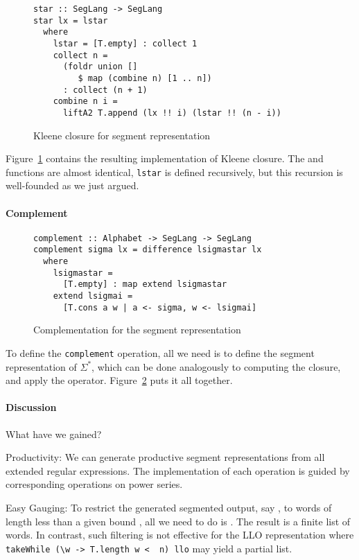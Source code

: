 \begin{figure}[tp]
\begin{lstlisting}
star :: SegLang -> SegLang
star lx = lstar
  where
    lstar = [T.empty] : collect 1
    collect n =
      (foldr union [] 
         $ map (combine n) [1 .. n])
      : collect (n + 1)
    combine n i =
      liftA2 T.append (lx !! i) (lstar !! (n - i))
\end{lstlisting}
  \caption{Kleene closure for segment representation}
  \label{fig:star-with-segments}
\end{figure}
Figure~\ref{fig:star-with-segments} contains the resulting implementation of Kleene closure.
The  and  functions are almost
identical, \lstinline{lstar} is defined recursively, but this recursion is well-founded as
we just argued. 

\paragraph{Complement}
\begin{figure}[tp]
\begin{lstlisting}
complement :: Alphabet -> SegLang -> SegLang
complement sigma lx = difference lsigmastar lx
  where
    lsigmastar =
      [T.empty] : map extend lsigmastar
    extend lsigmai =
      [T.cons a w | a <- sigma, w <- lsigmai]
\end{lstlisting}
  \caption{Complementation for the segment representation}
  \label{fig:llo-complement}
\end{figure}
To define the \lstinline{complement} operation, all we need is to define the segment
representation of $\Sigma^*$, which can be done analogously to computing the closure, and
apply the  operator. Figure~\ref{fig:llo-complement} puts it all together.

\paragraph{Discussion}\label{sec:motivation-discussion}
What have we gained?

Productivity: We can generate productive segment
representations from all extended regular expressions. The implementation of each
operation is guided by corresponding operations on power series.

Easy Gauging: To restrict the generated segmented output, say , to words of
length less than a given 
bound , all we need to do is . The result is
a finite list of words. In contrast, such filtering is not effective
for the LLO representation where
\lstinline{takeWhile (\w -> T.length w <  n) llo} may yield a partial list.


